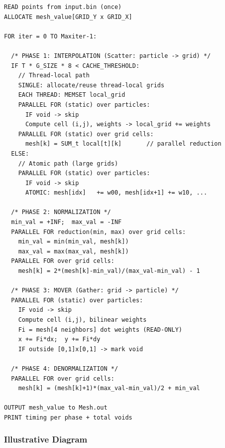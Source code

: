\documentclass[12pt,a4paper]{article}
\begin{document}
\begin{lstlisting}[style=pseudocode, caption={Pseudocode for Assignment 07 parallel PIC loop}]
READ points from input.bin (once)
ALLOCATE mesh_value[GRID_Y x GRID_X]

FOR iter = 0 TO Maxiter-1:

  /* PHASE 1: INTERPOLATION (Scatter: particle -> grid) */
  IF T * G_SIZE * 8 < CACHE_THRESHOLD:
    // Thread-local path
    SINGLE: allocate/reuse thread-local grids
    EACH THREAD: MEMSET local_grid
    PARALLEL FOR (static) over particles:
      IF void -> skip
      Compute cell (i,j), weights -> local_grid += weights
    PARALLEL FOR (static) over grid cells:
      mesh[k] = SUM_t local[t][k]       // parallel reduction
  ELSE:
    // Atomic path (large grids)
    PARALLEL FOR (static) over particles:
      IF void -> skip
      ATOMIC: mesh[idx]   += w00, mesh[idx+1] += w10, ...

  /* PHASE 2: NORMALIZATION */
  min_val = +INF;  max_val = -INF
  PARALLEL FOR reduction(min, max) over grid cells:
    min_val = min(min_val, mesh[k])
    max_val = max(max_val, mesh[k])
  PARALLEL FOR over grid cells:
    mesh[k] = 2*(mesh[k]-min_val)/(max_val-min_val) - 1

  /* PHASE 3: MOVER (Gather: grid -> particle) */
  PARALLEL FOR (static) over particles:
    IF void -> skip
    Compute cell (i,j), bilinear weights
    Fi = mesh[4 neighbors] dot weights (READ-ONLY)
    x += Fi*dx;  y += Fi*dy
    IF outside [0,1]x[0,1] -> mark void

  /* PHASE 4: DENORMALIZATION */
  PARALLEL FOR over grid cells:
    mesh[k] = (mesh[k]+1)*(max_val-min_val)/2 + min_val

OUTPUT mesh_value to Mesh.out
PRINT timing per phase + total voids
\end{lstlisting}

\subsubsection{Illustrative Diagram}
\end{document}
